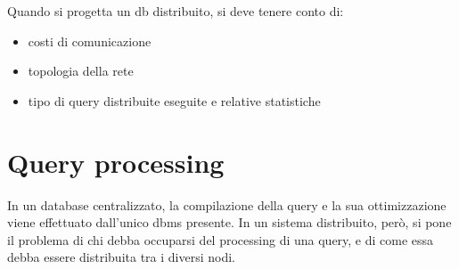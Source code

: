 Quando si progetta un db distribuito, si deve tenere conto di:
\begin{itemize}
    \item costi di comunicazione
    \item topologia della rete
    \item tipo di query distribuite eseguite e relative statistiche
\end{itemize}

\section{Query processing}
In un database centralizzato, la compilazione della query e la sua ottimizzazione
viene effettuato dall'unico dbms presente.
In un sistema distribuito, però, si pone il problema di chi debba occuparsi
del processing di una query, e di come essa debba essere distribuita tra i
diversi nodi.

